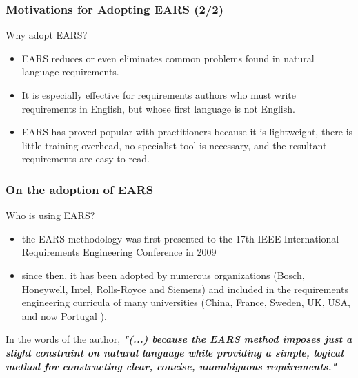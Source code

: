 \documentclass[aspectratio=169]{beamer}
\begin{document}
%
\begin{frame}
  \frametitle{Motivations for Adopting EARS (2/2)}
  \begin{block}{Why adopt EARS?}
  \begin{itemize}
    \item EARS reduces or even eliminates common problems found in natural language requirements. 
    \item It is especially effective for requirements authors who must write requirements in English, but whose first language is not English. 
    \item EARS has proved popular with practitioners because it is lightweight, there is little training overhead, no specialist tool is necessary, and the resultant requirements are easy to read.
  \end{itemize}
  \end{block} 
\end{frame}
%
\begin{frame}
  \frametitle{On the adoption of EARS}
  \begin{block}{Who is using EARS?}
  \begin{itemize}
    \item the EARS methodology was first presented to the 17th IEEE International Requirements Engineering Conference in 2009
    \item since then, it has been adopted by numerous organizations (Bosch, Honeywell, Intel, Rolls-Royce and Siemens) and included in the requirements engineering curricula of many universities (China, France, Sweden, UK, USA, and now Portugal {\Large\smiley{}}).  
  \end{itemize}
  In the words of the author, {\it {\bf "(...) because the EARS method imposes just a slight constraint on natural language while providing a simple, logical method for constructing clear, concise, unambiguous requirements."}}
  \end{block} 
\end{frame}
%
%
%
\end{document}
